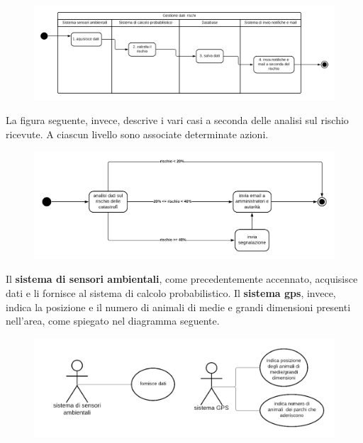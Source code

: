 \begin{figure}[ht]
    \centering
    \includegraphics[scale=0.25]{Img/swim_gestione_rischi.png}
\end{figure}

La figura seguente, invece, descrive i vari casi a seconda delle analisi sul rischio ricevute. A ciascun livello sono associate determinate azioni.

\begin{figure}[ht]
    \centering
    \includegraphics[scale=0.3]{Img/activity_rischi.png}
\end{figure}

\pagebreak

Il \textbf{sistema di sensori ambientali}, come precedentemente accennato, acquisisce dati e li fornisce al sistema di calcolo probabilistico. Il \textbf{sistema gps}, invece, indica la posizione e il numero di animali di medie e grandi dimensioni presenti nell'area, come spiegato nel diagramma seguente.

\begin{figure}[ht]
    \centering
    \includegraphics[scale=0.4]{Img/gestione_animali.png}
\end{figure}

